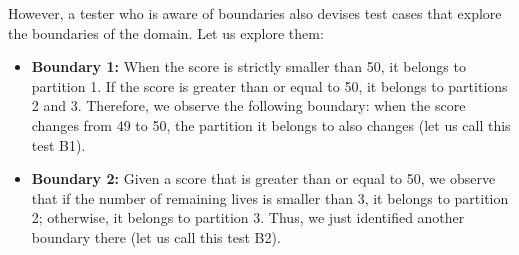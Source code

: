 \begin{Shaded}
\begin{Highlighting}[]
 

    \NormalTok{();}

   \NormalTok{() \{}
    \NormalTok{(}\NormalTok{+}\NormalTok{(}\NormalTok{, }\NormalTok{));}
\NormalTok{  \}}

   \NormalTok{() \{}
    \NormalTok{(}\NormalTok{+}\NormalTok{(}\NormalTok{, }\NormalTok{));}
\NormalTok{  \}}

   \NormalTok{() \{}
    \NormalTok{(}\NormalTok{*}\NormalTok{(}\NormalTok{, }\NormalTok{));}
\NormalTok{  \}}
\NormalTok{\}}
\end{Highlighting}
\end{Shaded}

However, a tester who is aware of boundaries also devises test cases
that explore the boundaries of the domain. Let us explore them:

\begin{itemize}
\item
  \textbf{Boundary 1:} When the score is strictly smaller than 50, it
  belongs to partition 1. If the score is greater than or equal to 50,
  it belongs to partitions 2 and 3. Therefore, we observe the following
  boundary: when the score changes from 49 to 50, the partition it
  belongs to also changes (let us call this test B1).
\item
  \textbf{Boundary 2:} Given a score that is greater than or equal to
  50, we observe that if the number of remaining lives is smaller than
  3, it belongs to partition 2; otherwise, it belongs to partition 3.
  Thus, we just identified another boundary there (let us call this test
  B2).
\end{itemize}

